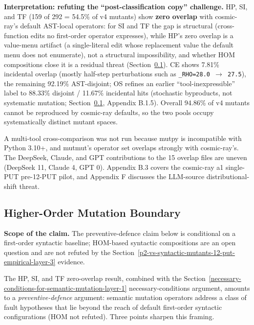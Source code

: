 \documentclass[manuscript,screen,review]{acmart}
\begin{document}
\textbf{Interpretation: refuting the ``post-classification copy'' challenge.}
HP, SI, and TF (159 of 292 = 54.5\% of v4 mutants) show \textbf{zero overlap}
with cosmic-ray's default AST-local operators: for SI and TF the gap is
structural (cross-function edits no first-order operator expresses), while HP's
zero overlap is a value-menu artifact (a single-literal edit whose replacement
value the default menu does not enumerate), not a structural impossibility, and
whether HOM compositions \citep{jia2008subtle} close it is a residual threat
(Section~\ref{preventive-defence-framing}). CE shows 7.81\% incidental overlap
(mostly half-step perturbations such as \texttt{\_RHO=28.0\ $\to$\ 27.5}), the
remaining 92.19\% AST-disjoint; OS refines an earlier ``tool-inexpressible''
label to 88.33\% disjoint / 11.67\% incidental hits (stochastic byproducts, not
systematic mutation; Section~\ref{preventive-defence-framing}, Appendix B.1.5).
Overall 94.86\% of v4 mutants cannot be reproduced by cosmic-ray defaults, so the
two pools occupy systematically distinct mutant spaces.

A multi-tool cross-comparison was not run because mutpy is incompatible
with Python 3.10+, and mutmut's operator set overlaps strongly with
cosmic-ray's. The DeepSeek, Claude, and GPT contributions to the 15
overlap files are uneven (DeepSeek 11, Claude 4, GPT 0). Appendix B.3
covers the cosmic-ray a1 single-PUT pre-12-PUT pilot, and Appendix F
discusses the LLM-source distributional-shift threat.

\subsection{Higher-Order Mutation Boundary}\label{preventive-defence-framing}

\textbf{Scope of the claim.} The preventive-defence claim below is
conditional on a first-order syntactic baseline; HOM-based syntactic
compositions are an open question and are not refuted by the Section~\ref{p2-vs-syntactic-mutants-12-put-empirical-layer-3}
evidence.

The HP, SI, and TF zero-overlap result, combined with the Section~\ref{necessary-conditions-for-semantic-mutation-layer-1}
necessary-conditions argument, amounts to a \emph{preventive-defence}
argument: semantic mutation operators address a class of fault
hypotheses that lie beyond the reach of default first-order syntactic
configurations (HOM not refuted). Three points sharpen
this framing.
\end{document}
